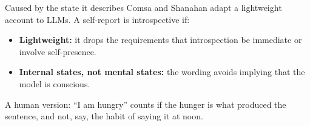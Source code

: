 \documentclass[aspectratio=169,11pt]{beamer}
\begin{document}
\begin{frame}[label=causal]{Caused by the state it describes}
Comsa and Shanahan adapt a lightweight account to LLMs. A self-report is introspective if:

\vspace{0.2em}
\begin{center}
\end{center}

\vspace{0.2em}
\begin{itemize}\setlength\itemsep{2pt}
  \item {\small \textbf{Lightweight:} it drops the requirements that introspection be immediate or involve self-presence.}
  \item {\small \textbf{Internal states, not mental states:} the wording avoids implying that the model is conscious.}
\end{itemize}

{\small A human version: ``I am hungry'' counts if the hunger is what produced the sentence, and not, say, the habit of saying it at noon.}
\end{frame}
\end{document}
